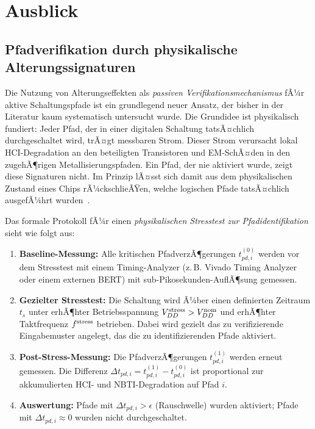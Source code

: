 ﻿\documentclass[a4paper,12pt]{article}
\theoremstyle{definition}
\begin{document}
\section{Ausblick}
\label{sec:ausblick}

\subsection{Pfadverifikation durch physikalische Alterungssignaturen}
\label{sub:pfad}

Die Nutzung von Alterungseffekten als \emph{passiven Verifikationsmechanismus}
fÃ¼r aktive Schaltungspfade ist ein grundlegend neuer Ansatz, der bisher in der
Literatur kaum systematisch untersucht wurde. Die Grundidee ist physikalisch
fundiert: Jeder Pfad, der in einer digitalen Schaltung tatsÃ¤chlich durchgeschaltet
wird, trÃ¤gt messbaren Strom. Dieser Strom verursacht lokal HCI-Degradation
an den beteiligten Transistoren und EM-SchÃ¤den in den zugehÃ¶rigen Metallisierungspfaden.
Ein Pfad, der nie aktiviert wurde, zeigt diese Signaturen nicht. Im Prinzip lÃ¤sst
sich damit aus dem physikalischen Zustand eines Chips rÃ¼ckschlieÃŸen, welche logischen
Pfade tatsÃ¤chlich ausgefÃ¼hrt wurden~\cite{hu1985,alam2005}.

Das formale Protokoll fÃ¼r einen \emph{physikalischen Stresstest zur Pfadidentifikation}
sieht wie folgt aus:
\begin{enumerate}
	\item \textbf{Baseline-Messung:} Alle kritischen PfadverzÃ¶gerungen $t_{pd,i}^{(0)}$
	      werden vor dem Stresstest mit einem Timing-Analyzer (z.\,B. Vivado Timing
	      Analyzer oder einem externen BERT) mit sub-Pikosekunden-AuflÃ¶sung gemessen.
	\item \textbf{Gezielter Stresstest:} Die Schaltung wird Ã¼ber einen definierten
	      Zeitraum $t_s$ unter erhÃ¶hter Betriebsspannung $V_{DD}^{\rm stress} > V_{DD}^{\rm nom}$
	      und erhÃ¶hter Taktfrequenz $f^{\rm stress}$ betrieben. Dabei wird gezielt
	      das zu verifizierende Eingabemuster angelegt, das die zu identifizierenden
	      Pfade aktiviert.
	\item \textbf{Post-Stress-Messung:} Die PfadverzÃ¶gerungen $t_{pd,i}^{(1)}$ werden
	      erneut gemessen. Die Differenz $\Delta t_{pd,i} = t_{pd,i}^{(1)} - t_{pd,i}^{(0)}$
	      ist proportional zur akkumulierten HCI- und NBTI-Degradation auf Pfad $i$.
	\item \textbf{Auswertung:} Pfade mit $\Delta t_{pd,i} > \epsilon$ (Rauschwelle)
	      wurden aktiviert; Pfade mit $\Delta t_{pd,i} \approx 0$ wurden nicht durchgeschaltet.
\end{enumerate}
\end{document}
